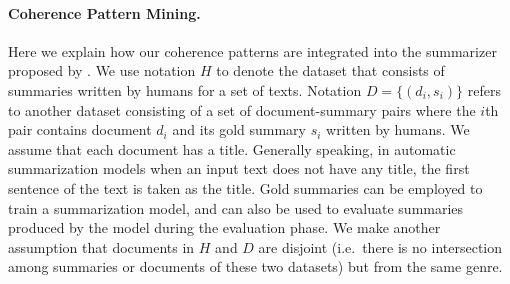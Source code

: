
\paragraph{Coherence Pattern Mining.}
Here we explain how our coherence patterns are integrated into the summarizer proposed by . 
We use notation $H$ to denote the dataset that consists of summaries written by humans for a set of texts.  
Notation $D=\lbrace \left( d_i, s_i \right) \rbrace$ refers to another dataset consisting of a set of document-summary pairs where the $i$th pair contains document $d_i$ and  its gold summary $s_i$ written by humans.  
We assume that each document has a title. 
Generally speaking, in automatic summarization models when an input text does not have any title, the first sentence of the text is taken as the title. 
Gold summaries can be employed to train a summarization model, and can also be used to evaluate summaries produced by the model during the evaluation phase. 
We make another assumption that documents in $H$ and $D$ are disjoint (i.e.\ there is no intersection among summaries or documents of these two datasets) but from the same genre. 

